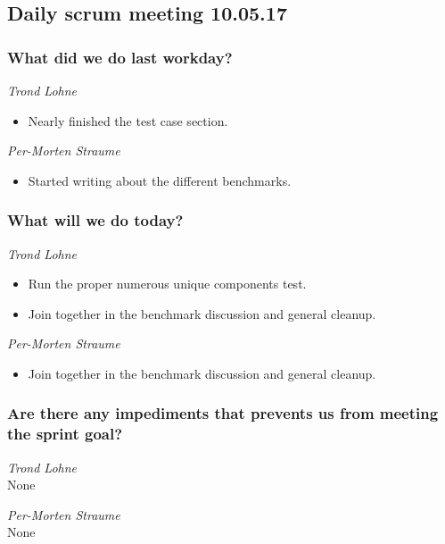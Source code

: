 \documentclass{article}
\begin{document}
\begin{center}
\subsection*{Daily scrum meeting 10.05.17}
\end{center}
\bigskip


\subsubsection*{What did we do last workday?}

\noindent\textit{Trond Lohne}
\begin{itemize}
	\item
	Nearly finished the test case section.
\end{itemize}

\medskip

\noindent\textit{Per-Morten Straume}
\begin{itemize}
	\item
    Started writing about the different benchmarks.
\end{itemize}


\subsubsection*{What will we do today?}

\noindent\textit{Trond Lohne}
\begin{itemize}
	\item
	Run the proper numerous unique components test.

    \item
    Join together in the benchmark discussion and general cleanup.
\end{itemize}

\medskip

\noindent\textit{Per-Morten Straume}
\begin{itemize}
	\item
	Join together in the benchmark discussion and general cleanup.
\end{itemize}


\subsubsection*{Are there any impediments that prevents us from meeting the sprint goal?}

\noindent\textit{Trond Lohne}\\
None

\medskip

\noindent\textit{Per-Morten Straume}\\
None
\end{document}
